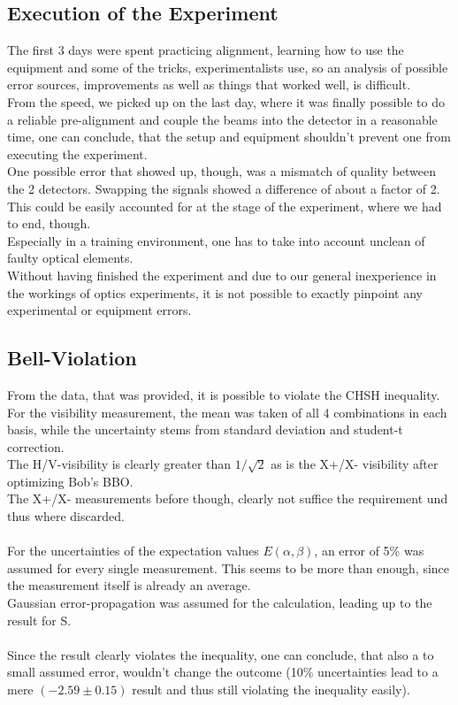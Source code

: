 \documentclass[12pt,a4paper]{article}
\begin{document}
\begin{multicols}{2}
\subsection{Execution of the Experiment}
The first 3 days were spent practicing alignment, learning how to use the equipment and some of the tricks, experimentalists use, so an analysis of possible error sources, improvements as well as things that worked well, is difficult.\\
From the speed, we picked up on the last day, where it was finally possible to do a reliable pre-alignment and couple the beams into the detector in a reasonable time, one can conclude, that the setup and equipment shouldn't prevent one from executing the experiment.\\
One possible error that showed up, though, was a mismatch of quality between the 2 detectors. Swapping the signals showed a difference of about a factor of 2. This could be easily accounted for at the stage of the experiment, where we had to end, though.\\
Especially in a training environment, one has to take into account unclean of faulty optical elements.\\
Without having finished the experiment and due to our general inexperience in the workings of optics experiments, it is not possible to exactly pinpoint any experimental or equipment errors.

\subsection{Bell-Violation}
From the data, that was provided, it is possible to violate the CHSH inequality.\\
For the visibility measurement, the mean was taken of all 4 combinations in each basis, while the uncertainty stems from standard deviation and student-t correction.\\
The H/V-visibility is clearly greater than $1/\sqrt{2}$ as is the X+/X- visibility after optimizing Bob's BBO.\\
The X+/X- measurements before though, clearly not suffice the requirement und thus where discarded.\\
\\
For the uncertainties of the expectation values $E(\alpha, \beta)$, an error of 5\% was assumed for every single measurement. This seems to be more than enough, since the measurement itself is already an average.\\
Gaussian error-propagation was assumed for the calculation, leading up to the result for S.\\
\\
Since the result clearly violates the inequality, one can conclude, that also a to small assumed error, wouldn't change the outcome (10\% uncertainties lead to a mere $(-2.59 \pm 0.15)$ result and thus still violating the inequality easily).






\end{multicols}
\end{document}
